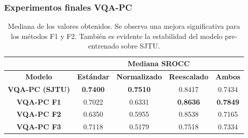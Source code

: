 \begin{frame}
  \frametitle{Experimentos finales VQA-PC}
\begin{table}[htp]
  \small
  \centering
\begin{tabular}{|c|cccc|}
\hline
\rowcolor[HTML]{FFC702}
                       & \multicolumn{4}{c|}{\textbf{Mediana SROCC}}                                                                                                          \\ \hline
\rowcolor[HTML]{FFC702}
\textbf{Modelo}        & \multicolumn{1}{c|}{\textbf{Estándar}} & \multicolumn{1}{c|}{\textbf{Normalizado}} & \multicolumn{1}{c|}{\textbf{Reescalado}} & \textbf{Ambos}  \\ \hline
\textbf{VQA-PC (SJTU)} & \multicolumn{1}{c|}{\textbf{0.7400}}   & \multicolumn{1}{c|}{\textbf{0.7510}}      & \multicolumn{1}{c|}{0.8417}             & 0.7434          \\ \hline
\textbf{VQA-PC F1}     & \multicolumn{1}{c|}{0.7022}            & \multicolumn{1}{c|}{0.6331}               & \multicolumn{1}{c|}{\textbf{0.8636}}    & \textbf{0.7849} \\ \hline
\textbf{VQA-PC F2}     & \multicolumn{1}{c|}{0.6350}            & \multicolumn{1}{c|}{0.5955}               & \multicolumn{1}{c|}{0.8538}             & 0.7165          \\ \hline
\textbf{VQA-PC F3}     & \multicolumn{1}{c|}{0.7118}            & \multicolumn{1}{c|}{0.5179}               & \multicolumn{1}{c|}{0.7518}             & 0.7334          \\ \hline
\end{tabular}
\caption[Mediana de los valores sobre imágenes médicas.]{
  Mediana de los valores obtenidos. Se observa una mejora significativa para 
  los métodos F1 y F2. También es evidente la estabilidad del modelo pre-entrenado sobre SJTU. 
}
\label{tab:PercentileMed}
\end{table}
\end{frame}

